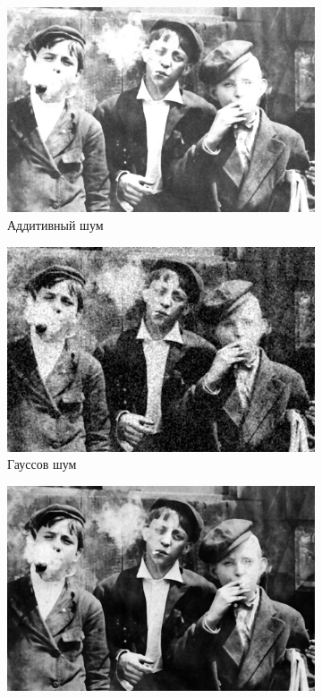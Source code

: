 \begin{figure}[ht!]
\begin{subfigure}[b]{0.5\linewidth}
      \includegraphics[width=0.95\linewidth]{../Median_FIlter/Median_Additive_noise_(k=5).jpg} 
      \caption{Аддитивный шум} 
      \label{median_5:c} 
      \vspace{4ex}
    \end{subfigure}%
    \begin{subfigure}[b]{0.5\linewidth}
      \centering
      \includegraphics[width=0.95\linewidth]{../Median_FIlter/Median_Gaussian_noise_(k=5).jpg} 
      \caption{Гауссов шум} 
      \label{median_5:d} 
      \vspace{4ex}
    \end{subfigure}
    \begin{subfigure}[b]{0.5\linewidth}
      \centering
      \includegraphics[width=0.95\linewidth]{../Median_FIlter/Median_Poisson_noise_(k=5).jpg} 

\end{subfigure}
\end{figure}
